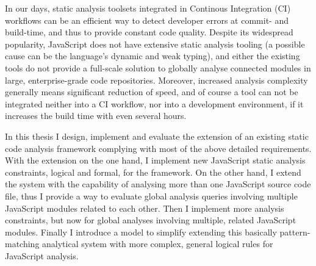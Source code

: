 	In our days, static analysis toolsets integrated in Continous Integration (CI) workflows can be an efficient way to detect developer errors at commit- and build-time, and thus to provide constant code quality. Despite its widespread popularity, JavaScript does not have extensive static analysis tooling (a possible cause can be the language's dynamic and weak typing), and either the existing tools do not provide a full-scale solution to globally analyse connected modules in large, enterprise-grade code repositories. Moreover, increased analysis complexity generally means significant reduction of speed, and of course a tool can not be integrated neither into a CI workflow, nor into a development environment, if it increases the build time with even several hours.

	In this thesis I design, implement and evaluate the extension of an existing static code analysis framework complying with most of the above detailed requirements. With the extension on the one hand, I implement new JavaScript static analysis constraints, logical and formal, for the framework. On the other hand, I extend the system with the capability of analysing more than one JavaScript source code file, thus I provide a way to evaluate global analysis queries involving multiple JavaScript modules related to each other. Then I implement more analysis constraints, but now for global analyses involving multiple, related JavaScript modules. Finally I introduce a model to simplify extending this basically pattern-matching analytical system with more complex, general logical rules for JavaScript analysis.

